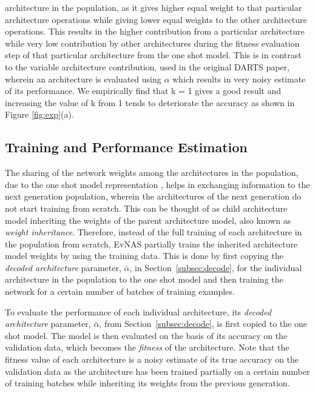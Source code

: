 \documentclass[final]{cvpr}
\begin{document}
architecture in the population, as it gives higher equal weight to that particular architecture
operations while giving lower equal weights to the other architecture operations. This results in
the higher contribution from a particular architecture while very low contribution by other
architectures during the fitness evaluation step of that particular architecture from the one shot
model. This is in contrast to the variable architecture contribution, used in the original DARTS
paper, wherein an architecture is evaluated using $\alpha$ which results in very noisy estimate of
its performance. We empirically find that k = 1 gives a good result and increasing the value of k
from 1 tends to deteriorate the accuracy as shown in Figure \ref{fig:exp}(a).

\subsection{Training and Performance Estimation}
The sharing of the network weights among the architectures in the population, due to the one shot
model representation \cite{liu2018darts2}, helps in exchanging information to the next generation
population, wherein the architectures of the next generation do not start training from scratch.
This can be thought of as child architecture model inheriting the weights of the parent
architecture model, also known as \textit{weight inheritance}. Therefore, instead of the full
training of each architecture in the population from scratch, EvNAS partially trains the inherited
architecture model weights by using the training data. This is done by first copying the
\textit{decoded architecture} parameter, $\bar{\alpha}$, in Section~\ref{subsec:decode}, for the
individual architecture in the population to the one shot model and then training the network for
a certain number of batches of training examples. 

To evaluate the performance of each individual architecture, its \textit{decoded architecture}
parameter, $\bar{\alpha}$, from Section~\ref{subsec:decode}, is first copied to the one shot 
model. The model is then evaluated on the basis of its accuracy on the validation data, 
which becomes the \textit{fitness} of the architecture. Note that the fitness value of each
architecture is a noisy estimate of its true accuracy on the validation data as the architecture
has been trained partially on a certain number of training batches while inheriting its weights
from the previous generation.
\end{document}
